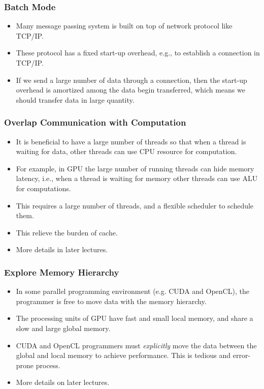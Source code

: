 \documentclass{beamer}
\begin{document}
\begin{CJK}{UTF8}{bsmi}
\begin{frame}
\frametitle{Batch Mode}
\begin{itemize}
\item Many message passing system is built on top of network protocol
  like TCP/IP.
\item These protocol has a fixed start-up overhead, e.g., to establish
  a connection in TCP/IP.
\item If we send a large number of data through a connection, then the
  start-up overhead is amortized among the data begin transferred, which
  means we should transfer data in large quantity.
\end{itemize}
\end{frame}

\begin{frame}
\frametitle{Overlap Communication with Computation}
\begin{itemize}
\item It is beneficial to have a large number of threads so that when
  a thread is waiting for data, other threads can use CPU resource for
  computation.
\item For example, in GPU the large number of running threads can hide
  memory latency, i.e., when a thread is waiting for memory other
  threads can use ALU for computations.
\item This requires a large number of threads, and a flexible
  scheduler to schedule them.  
\item This relieve the burden of cache.
\item More details in later lectures.
\end{itemize}
\end{frame}

\begin{frame}
\frametitle{Explore Memory Hierarchy}
\begin{itemize}
\item In some parallel programming environment (e.g. CUDA and OpenCL),
  the programmer is free to move data with the memory hierarchy.
\item The processing units of GPU have fast and small local memory,
  and share a slow and large global memory.
\item CUDA and OpenCL programmers must {\em explicitly} move the data
  between the global and local memory to achieve performance.  This is
  tedious and error-prone process.
\item More details on later lectures.
\end{itemize}
\end{frame}

\end{CJK}
\end{document}
